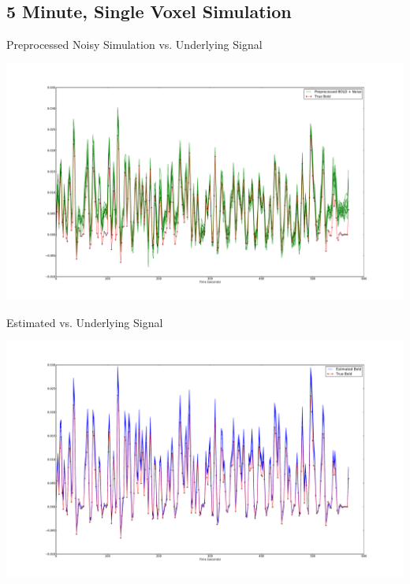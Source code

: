 \documentclass{beamer}
\begin{document}
\subsection{5 Minute, Single Voxel Simulation}
\begin{frame}{Preprocessed Noisy Simulation vs. Underlying Signal}
\begin{center}
\includegraphics[clip=true,trim=6cm 2cm 5cm 3.5cm,width=.9\textwidth]
            {preprocessed_lownoise}
\end{center}
\end{frame}

\begin{frame}{Estimated vs. Underlying Signal}
\begin{center}
\includegraphics[clip=true,trim=6cm 2cm 5cm 3.5cm,width=.9\textwidth]
            {comparison_lownoise}
\end{center}
\end{frame}
\end{document}
